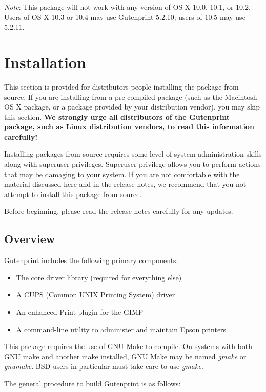 \documentclass{article}[letter]
\begin{document}
{\it Note}: This package will not work with any version of OS X 10.0,
10.1, or 10.2. Users of OS X 10.3 or 10.4 may use Gutenprint 5.2.10;
users of 10.5 may use 5.2.11.

\section{Installation}

This section is provided for distributors people installing the
package from source. If you are installing from a pre-compiled package
(such as the Macintosh OS X package, or a package provided by your
distribution vendor), you may skip this section. {\bf We strongly urge
all distributors of the Gutenprint package, such as Linux distribution
vendors, to read this information carefully!}

Installing packages from source requires some level of system
administration skills along with superuser privileges. Superuser
privilege allows you to perform actions that may be damaging to your
system. If you are not comfortable with the material discussed here
and in the release notes, we recommend that you not attempt to install
this package from source.

Before beginning, please read the release notes carefully for any
updates.

\subsection{Overview}

Gutenprint includes the following primary components:

\begin{itemize}
\item The core driver library (required for everything else)
\item A CUPS (Common UNIX Printing System) driver
\item An enhanced Print plugin for the GIMP
\item A command-line utility to administer and maintain Epson printers
\end{itemize}

This package requires the use of GNU Make to compile. On systems with
both GNU make and another make installed, GNU Make may be named {\em gmake}
or {\em gnumake}. BSD users in particular must take care to use {\em gmake}.

The general procedure to build Gutenprint is as follows:
\end{document}

